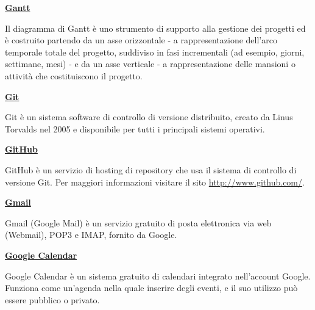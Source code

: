 \begin{addmargin}[0em]{0em}	
	\textbf{\underline{Gantt}} 
\end{addmargin}

\medskip
\begin{addmargin}[5em]{1em}	
Il diagramma di Gantt è uno strumento di supporto alla gestione dei progetti ed è costruito partendo da un asse orizzontale - a rappresentazione dell'arco temporale totale del progetto, suddiviso in fasi incrementali (ad esempio, giorni, settimane, mesi) - e da un asse verticale - a rappresentazione delle mansioni o attività che costituiscono il progetto. 
\end{addmargin}	

\bigskip
\begin{addmargin}[0em]{0em}	
	\textbf{\underline{Git}}
\end{addmargin}

\medskip
\begin{addmargin}[5em]{1em}	
Git è un sistema software di controllo di versione distribuito, creato da Linus Torvalds nel 2005 e disponibile per tutti i principali sistemi operativi.
\end{addmargin}

\bigskip
\begin{addmargin}[0em]{0em}	
	\textbf{\underline{GitHub}}
\end{addmargin}

\medskip
\begin{addmargin}[5em]{1em}	
GitHub è un servizio di hosting di repository che usa il sistema di controllo di versione Git.
Per maggiori informazioni visitare il sito \url{http://www.github.com/}.
\end{addmargin}

\bigskip
\begin{addmargin}[0em]{0em}	
	\textbf{\underline{Gmail}}
\end{addmargin}

\medskip
\begin{addmargin}[5em]{1em}	
Gmail (Google Mail) è un servizio gratuito di posta elettronica via web (Webmail), POP3 e IMAP, fornito da Google.
\end{addmargin}	

\bigskip
\begin{addmargin}[0em]{0em}
	\textbf{\underline{Google Calendar}}
\end{addmargin}

\medskip
\begin{addmargin}[5em]{1em}	
Google Calendar è un sistema gratuito di calendari integrato nell'account Google.
Funziona come un'agenda nella quale inserire degli eventi, e il suo utilizzo può essere pubblico o privato.
\end{addmargin}

